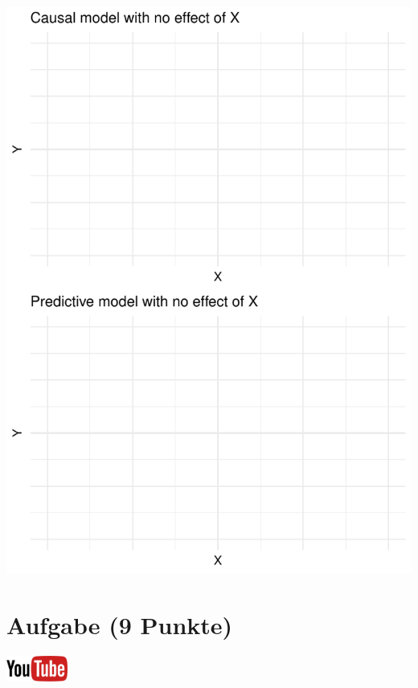 \documentclass[a4paper, 9pt]{scrartcl}\usepackage[]{graphicx}\usepackage[]{xcolor}
\makeatletter
\def\maxwidth{ %
  \ifdim\Gin@nat@width>\linewidth
    \linewidth
  \else
    \Gin@nat@width
  \fi
}
\makeatother
\begin{document}
{\centering \includegraphics[width=\maxwidth]{img/modeling-01-1} 

}



 
\clearpage

\section{Aufgabe \hfill (9 Punkte)}

\hfill\href{https://youtu.be/fB6nF4dxodA}{\includegraphics[width =
  2cm]{img/youtube}}\\[1Ex]
\end{document}
